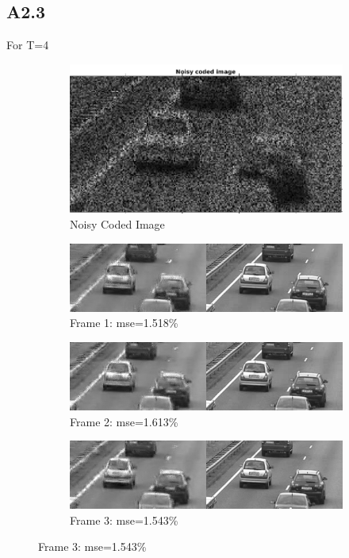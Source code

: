 \documentclass{article}
\begin{document}
\subsection*{A2.3}
For T=4
\begin{figure}[H]
  \centering

  
  \begin{subfigure}[t]{1.0\linewidth}
    \centering
    \includegraphics[scale=0.25]{images/noisy_coded_img_t4}
    \caption{Noisy Coded Image}
  \end{subfigure}
  
  \begin{subfigure}[t]{1.0\linewidth}
    \centering
    \includegraphics[scale=0.5]{images/frame_1_t4}
      \caption{Frame 1: mse=1.518\%}
  \end{subfigure}

  \begin{subfigure}[t]{1.0\linewidth}
    \centering
    \includegraphics[scale=0.5]{images/frame_2_t4}
    \caption{Frame 2: mse=1.613\%}
  \end{subfigure}

  \begin{subfigure}[t]{1.0\linewidth}
    \centering
    \includegraphics[scale=0.5]{images/frame_3_t4}
    \caption{Frame 3: mse=1.543\%}
  \end{subfigure}


\end{figure}
\end{document}
